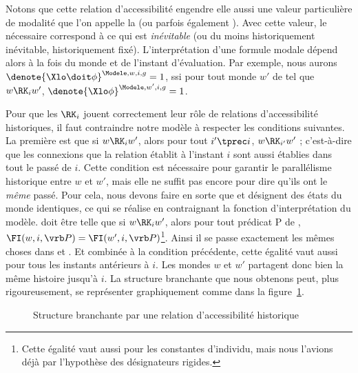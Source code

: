 \label{p.mhisto}

Notons que cette relation d'accessibilité engendre elle aussi une valeur particulière de modalité que l'on appelle la  (ou parfois également ).  Avec cette valeur, le nécessaire correspond à ce qui est \emph{inévitable} (ou du moins historiquement inévitable, historiquement fixé). 
L'interprétation d'une formule modale dépend alors à la fois du monde et de l'instant d'évaluation. Par exemple, nous aurons \(\denote{\Xlo\doit\phi}^{\Modele,w,i,g}=1\), ssi pour tout monde
  $w'$ de  tel que $w \RK_i w'$,  \(\denote{\Xlo\phi}^{\Modele,w',i,g}=1\).

\sloppy
Pour que les $\RK_i$ jouent correctement leur rôle de relations d'accessibilité historiques, il faut contraindre notre  modèle à respecter les conditions suivantes. 
La première est que si  $w\RK_i w'$, alors pour tout $i'\tprec i$, $w\RK_{i'}w'$ ; c'est-à-dire que les connexions que la relation établit à l'instant $i$ sont aussi établies dans tout le passé de $i$. Cette condition est nécessaire pour garantir le parallélisme historique entre $w$ et $w'$, mais elle ne suffit pas encore pour dire qu'ils ont le \emph{même} passé. 
Pour cela, nous devons faire en sorte que  et  désignent des états du monde identiques, ce qui se réalise en contraignant la fonction d'interprétation {\FI} du modèle. {\FI} doit être telle que si $w\RK_i w'$, alors pour tout prédicat \vrb P de {\LO}, $\FI(w,i,\vrb P)=\FI(w',i,\vrb P)$\footnote{Cette égalité vaut aussi pour les constantes d'individu, mais nous l'avions déjà par l'hypothèse des désignateurs rigides.}.  Ainsi il se passe exactement les mêmes choses dans  et . Et combinée à la condition précédente, cette égalité vaut aussi pour tous les instants antérieurs à $i$.
Les mondes $w$ et $w'$ partagent donc bien la même histoire jusqu'à $i$. 
La structure branchante que nous obtenons peut, plus rigoureusement, se représenter graphiquement comme dans la figure~\ref{futurs4}.

\fussy



\begin{figure}[h!]
\begin{center}
\scalebox{.9}{}
\caption{Structure branchante par une relation d'accessibilité historique}\label{futurs4}
\end{center}
\end{figure}

